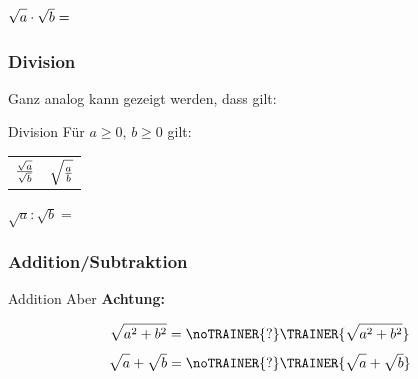 $\sqrt{\vphantom{b}a}\cdot\sqrt{b} =$



\subsubsection{Division}
Ganz analog kann gezeigt werden, dass gilt: 
\begin{gesetz}{Division}{}
  Für $a\ge 0$, $b\ge 0$ gilt:
  \begin{tabular}{c@{ = }c}
$\frac{\sqrt{\vphantom{b}a}}{\sqrt{b}}$  &  $\sqrt{\frac{\vphantom{b}a}{b}}$\\
    \end{tabular}
\end{gesetz}

$\sqrt{a} : \sqrt{b} =$


\subsubsection{Addition/Subtraktion}
\begin{bemerkung}{Addition}{}
  Aber \textbf{Achtung:}
  
$$\sqrt{a^2+b^2} = \noTRAINER{?}\TRAINER{\sqrt{a^2+b^2}}$$
  $$\sqrt{a\mathstrut{}} + \sqrt{b\mathstrut{}} = \noTRAINER{?}\TRAINER{\sqrt{a\mathstrut{}} + \sqrt{b\mathstrut{}}}$$
\end{bemerkung}

